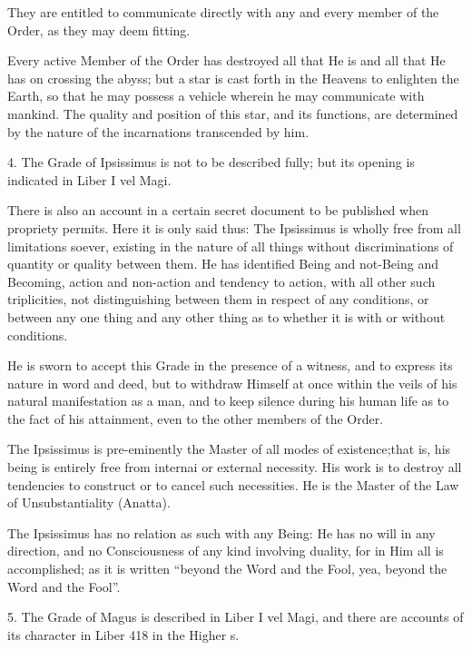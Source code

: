 They are entitled to communicate directly with any and every member of the Order, as they may deem fitting.

Every active Member of the Order has destroyed all that He is and all that He has on crossing the abyss; but a star is cast forth in the Heavens to enlighten the Earth, so that he may possess a vehicle wherein he may communicate with mankind. The quality and position of this star, and its functions, are determined by the nature of the incarnations transcended by him.

\vspace{\baselineskip}

4. The Grade of Ipsissimus is not to be described fully; but its opening is indicated in Liber I vel Magi.

There is also an account in a certain secret document to be published when propriety permits. Here it is only said thus: The Ipsissimus is wholly free from all limitations soever, existing in the nature of all things without discriminations of quantity or quality between them. He has identified Being and not-Being and Becoming, action and non-action and tendency to action, with all other such triplicities, not distinguishing between them in respect of any conditions, or between any one thing and any other thing as to whether it is with or without conditions.

He is sworn to accept this Grade in the presence of a witness, and to express its nature in word and deed, but to withdraw Himself at once within the veils of his natural manifestation as a man, and to keep silence during his human life as to the fact of his attainment, even to the other members of the Order.

The Ipsissimus is pre-eminently the Master of all modes of existence;that is, his being is entirely free from internai or external necessity. His work is to destroy all tendencies to construct or to cancel such necessities. He is the Master of the Law of Unsubstantiality (Anatta).

The Ipsissimus has no relation as such with any Being: He has no will in any direction, and no Consciousness of any kind involving duality, for in Him all is accomplished; as it is written \enquote{beyond the Word and the Fool, yea, beyond the Word and the Fool}.

\vspace{\baselineskip}

5. The Grade of Magus is described in Liber I vel Magi, and there are accounts of its character in Liber 418 in the Higher \AEthyr{}s.

